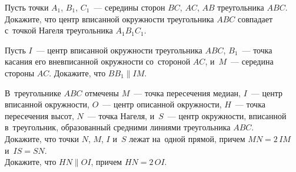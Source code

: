 \begin{problems}
\item
Пусть точки $A_1$, $B_1$, $C_1$~--- середины сторон $BC$, $AC$, $AB$
треугольника $ABC$.
Докажите, что центр вписанной окружности треугольника $ABC$ совпадает с~точкой
Нагеля треугольника $A_1 B_1 C_1$.

\item
Пусть $I$~--- центр вписанной окружности треугольника $ABC$,
$B_1$~--- точка касания его вневписанной окружности со~стороной $AC$,
и~$M$~--- середина стороны $AC$.
Докажите, что $B B_1 \parallel I M$.

\item
В~треугольнике $ABC$ отмечены
$M$~--- точка пересечения медиан,
$I$~--- центр вписанной окружности,
$O$~--- центр описанной окружности,
$H$~--- точка пересечения высот,
$N$~--- точка Нагеля,
и~$S$~--- центр окружности, вписанной в~треугольник, образованный средними
линиями треугольника $ABC$.
\\
\sbp
Докажите, что точки $N$, $M$, $I$ и~$S$ лежат на~одной прямой, причем
$MN = 2 \, IM$ и~$IS = SN$.
\\
\sbp
Докажите, что $HN \parallel OI$, причем $HN = 2 \, OI$.

\end{problems}

